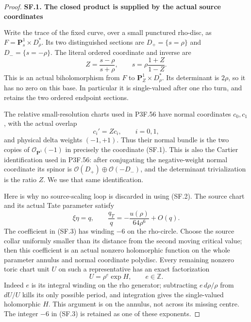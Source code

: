 \begin{proof}
\par

\medskip\noindent\textbf{SF.1. The closed product is supplied by the actual source coordinates}

\par\nobreak

Write the trace of the fixed curve, over a small punctured rho-disc, as
\(F=\mathbf P^1_s\times D_\rho^*\). Its two distinguished sections are
\(D_+=\{s=\rho\}\) and \(D_-=\{s=-\rho\}\). The literal ordered
coordinate and inverse are
\[
 Z=\frac{s-\rho}{s+\rho},\qquad
 s=\rho\frac{1+Z}{1-Z}.                                      \tag{SF.1}
\]
This is an actual biholomorphism from \(F\) to
\(\mathbf P^1_Z\times D_\rho^*\). Its determinant is \(2\rho\), so
it has no zero on this base. In particular it is single-valued after
one rho turn, and retains the two ordered endpoint sections.

The relative small-resolution charts used in P3F.56 have normal
coordinates \(c_0,c_1\), with the actual overlap
\[
             c_i'=Zc_i,\qquad i=0,1,                       \tag{SF.2}
\]
and physical delta weights \((-1,+1)\). Thus their normal bundle is the
two copies of \(\mathcal O_{\mathbf P^1}(-1)\) in precisely the
coordinate (SF.1). This is also the Cartier identification used in
P3F.56: after conjugating the negative-weight normal coordinate its
spinor is
\(\mathcal O(D_+)\oplus\mathcal O(-D_-)\), and the determinant
trivialization is the ratio \(Z\). We use that same identification.

Here is why no source-scaling loop is discarded in using (SF.2).
The source chart and its actual Tate parameter satisfy
\[
 \xi\eta=q,\qquad
 \frac{q_T}{q}=-\frac{u(\rho)}{64\rho^6}+O(q).               \tag{SF.3}
\]
The coefficient in (SF.3) has winding \(-6\) on the rho-circle.
Choose the source collar uniformly smaller than its distance from the
second moving critical value; then this coefficient is an actual
nonzero holomorphic function on the whole parameter annulus and
normal coordinate polydisc. Every remaining nonzero toric chart unit
\(U\) on such a representative has an exact factorization
\[
                    U=\rho^{e}\exp H,\qquad e\in\mathbb Z. \tag{SF.4}
\]
Indeed \(e\) is its integral winding on the rho generator; subtracting
\(e\,d\rho/\rho\) from \(dU/U\) kills its only possible period,
and integration gives the single-valued holomorphic \(H\). This
argument is on the annulus, not across its missing centre. The integer
\(-6\) in (SF.3) is retained as one of these exponents.


\end{proof}
